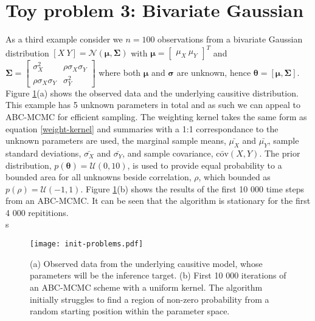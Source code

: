 \section{Toy problem 3: Bivariate Gaussian}
As a third example consider we $n = 100$ observations from a bivariate Gaussian distribution $[X\ Y] = \mathcal{N}(\bm{\mu},\bm{\Sigma})$ with $\bm{\mu} = \begin{bmatrix}
\mu_X\ \mu_Y
\end{bmatrix}^T$ and $\bm{\Sigma} = \begin{bmatrix}
\sigma^2_X & \rho\sigma_X\sigma_Y\\
\rho\sigma_X\sigma_Y & \sigma^2_Y
\end{bmatrix} $ where both $\bm{\mu}$ and $\bm{\sigma}$ are unknown, hence $\bm{\theta} = [\bm{\mu},\bm{\Sigma}]$. Figure \ref{init-qualms}(a) shows the observed data and the underlying causitive distribution. This example has 5 unknown parameters in total and as such we can appeal to ABC-MCMC for efficient sampling. The weighting kernel takes the same form as equation \ref{weight-kernel} and summaries with a 1:1 correspondance to the unknown parameters are used, the marginal sample means, $\bar{\mu_X}$ and $\bar{\mu_Y}$, sample standard deviations, $\bar{\sigma_X}$ and $\bar{\sigma_Y}$, and sample covariance, $\bar{\text{cov}}(X,Y)$. The prior distribution, $p(\bm{\theta}) = \mathcal{U}(0,10)$, is used to provide equal probability to a bounded area for all unknowns beside correlation, $\rho$, which bounded as $p(\rho) = \mathcal{U}(-1,1)$. Figure \ref{init-qualms}(b) shows the results of the first 10 000 time steps from an ABC-MCMC. It can be seen that the algorithm is stationary for the first 4 000 repititions.\\
s
\begin{figure}[H]
	\centering
	\texttt{[image: init-problems.pdf]}
	\caption{(a) Observed data from the underlying causitive model, whose parameters will be the inference target. (b) First 10 000 iterations of an ABC-MCMC scheme with a uniform kernel. The algorithm initially struggles to find a region of non-zero probability from a random starting position within the parameter space.}
	\label{init-qualms}
\end{figure}


